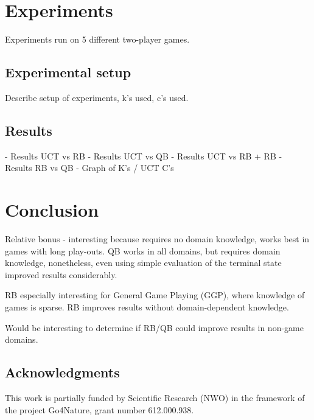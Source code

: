 \documentclass{ecai2010}
\begin{document}
\section{Experiments}
Experiments run on 5 different two-player games.
\subsection{Experimental setup}
Describe setup of experiments, k's used, c's used.

\subsection{Results}
- Results UCT vs RB
- Results UCT vs QB
- Results UCT vs RB + RB
- Results RB vs QB
- Graph of K's / UCT C's

\section{Conclusion}
Relative bonus - interesting because requires no domain knowledge, works best in games with long play-outs.
QB works in all domains, but requires domain knowledge, nonetheless, even using simple evaluation of the terminal state improved results considerably.

RB especially interesting for General Game Playing (GGP), where knowledge of games is sparse. RB improves results without domain-dependent knowledge.

Would be interesting to determine if RB/QB could improve results in non-game domains.

\subsection*{Acknowledgments}
This work is partially funded by Scientific Research (NWO) in the framework of the project Go4Nature, grant number 612.000.938.

\end{document}
